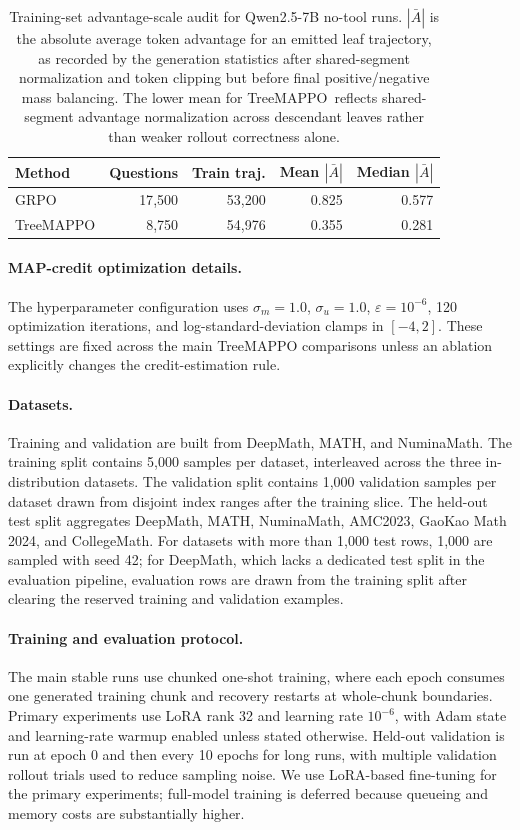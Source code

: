 \documentclass{article}
\newcommand{\ours}{TreeMAPPO\xspace}
\begin{document}
\begin{table}[t]
\centering
\small
\begin{tabular}{lrrrr}
\hline
Method & Questions & Train traj. & Mean $|\bar{A}|$ & Median $|\bar{A}|$ \\
\hline
GRPO & 17{,}500 & 53{,}200 & 0.825 & 0.577 \\
\ours & 8{,}750 & 54{,}976 & 0.355 & 0.281 \\
\hline
\end{tabular}
\caption{Training-set advantage-scale audit for Qwen2.5-7B no-tool runs. $|\bar{A}|$ is the absolute average token advantage for an emitted leaf trajectory, as recorded by the generation statistics after shared-segment normalization and token clipping but before final positive/negative mass balancing. The lower mean for \ours\ reflects shared-segment advantage normalization across descendant leaves rather than weaker rollout correctness alone.}
\label{tab:qwen25-notool-advantage-scale}
\end{table}

\paragraph{MAP-credit optimization details.}
The hyperparameter configuration uses $\sigma_m = 1.0$, $\sigma_u = 1.0$, $\varepsilon = 10^{-6}$, 120 optimization iterations, and log-standard-deviation clamps in $[-4,2]$. These settings are fixed across the main TreeMAPPO comparisons unless an ablation explicitly changes the credit-estimation rule.

\paragraph{Datasets.}
Training and validation are built from DeepMath, MATH, and NuminaMath. The training split contains 5{,}000 samples per dataset, interleaved across the three in-distribution datasets. The validation split contains 1{,}000 validation samples per dataset drawn from disjoint index ranges after the training slice. The held-out test split aggregates DeepMath, MATH, NuminaMath, AMC2023, GaoKao Math 2024, and CollegeMath. For datasets with more than 1{,}000 test rows, 1{,}000 are sampled with seed 42; for DeepMath, which lacks a dedicated test split in the evaluation pipeline, evaluation rows are drawn from the training split after clearing the reserved training and validation examples.

\paragraph{Training and evaluation protocol.}
The main stable runs use chunked one-shot training, where each epoch consumes one generated training chunk and recovery restarts at whole-chunk boundaries. Primary experiments use LoRA rank 32 and learning rate $10^{-6}$, with Adam state and learning-rate warmup enabled unless stated otherwise. Held-out validation is run at epoch 0 and then every 10 epochs for long runs, with multiple validation rollout trials used to reduce sampling noise. We use LoRA-based fine-tuning for the primary experiments; full-model training is deferred because queueing and memory costs are substantially higher.
\end{document}
